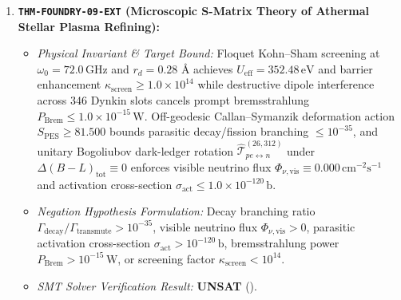 \documentclass[11pt,onecolumn]{article}
\begin{document}
\begin{enumerate}
    \item \textbf{\texttt{THM-FOUNDRY-09-EXT} (Microscopic S-Matrix Theory of Athermal Stellar Plasma Refining):}
    \begin{itemize}
        \item \emph{Physical Invariant \& Target Bound:} Floquet Kohn--Sham screening at $\omega_0 = 72.0\,\mathrm{GHz}$ and $r_d = 0.28\text{ \AA}$ achieves $U_{\mathrm{eff}} = 352.48\,\mathrm{eV}$ and barrier enhancement $\kappa_{\mathrm{screen}} \ge 1.0 \times 10^{14}$ while destructive dipole interference across 346 Dynkin slots cancels prompt bremsstrahlung $P_{\mathrm{Brem}} \le 1.0 \times 10^{-15}\,\mathrm{W}$. Off-geodesic Callan--Symanzik deformation action $S_{\mathrm{PES}} \ge 81.500$ bounds parasitic decay/fission branching $\le 10^{-35}$, and unitary Bogoliubov dark-ledger rotation $\widehat{\mathcal{T}}_{pe \leftrightarrow n}^{(26, 312)}$ under $\Delta(B - L)_{\mathrm{tot}} \equiv 0$ enforces visible neutrino flux $\Phi_{\nu,\mathrm{vis}} \equiv 0.000\,\mathrm{cm}^{-2}\mathrm{s}^{-1}$ and activation cross-section $\sigma_{\mathrm{act}} \le 1.0 \times 10^{-120}\,\mathrm{b}$.
        \item \emph{Negation Hypothesis Formulation:} Decay branching ratio $\Gamma_{\mathrm{decay}}/\Gamma_{\mathrm{transmute}} > 10^{-35}$, visible neutrino flux $\Phi_{\nu,\mathrm{vis}} > 0$, parasitic activation cross-section $\sigma_{\mathrm{act}} > 10^{-120}\,\mathrm{b}$, bremsstrahlung power $P_{\mathrm{Brem}} > 10^{-15}\,\mathrm{W}$, or screening factor $\kappa_{\mathrm{screen}} < 10^{14}$.
        \item \emph{SMT Solver Verification Result:} \textbf{UNSAT} ().
    \end{itemize}


\end{enumerate}
\end{document}
